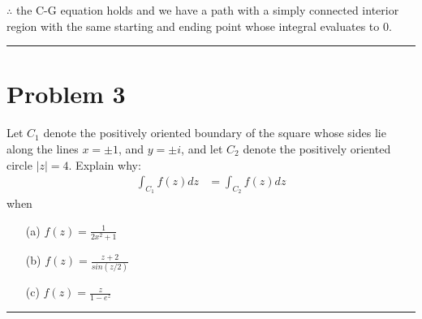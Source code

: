 \documentclass{article}
\begin{document}
$\therefore$ the C-G equation holds and we have a path with a simply connected interior region with the same starting and ending point whose integral evaluates to $0$. 
\vspace{1cm} %

\hrule

\newpage
\section*{Problem 3}
Let $C_1$ denote the positively oriented boundary of the square whose sides lie along the lines $x = \pm 1$, and $y=\pm i$, and let $C_2$ denote the positively oriented circle $|z| = 4$. Explain why:
\begin{align*}
  \int_{C_1}f(z)dz &= \int_{C_2}f(z)dz
\end{align*}
when
\begin{enumerate}
  \item[(a)] $f(z) = \frac{1}{2x^2+1}$
  \item[(b)] $f(z) = \frac{z+2}{sin(z/2)}$
  \item[(c)] $f(z) = \frac{z}{1-e^z}$
\end{enumerate}

\vspace{1cm} %

\hrule

% 
\end{document}
